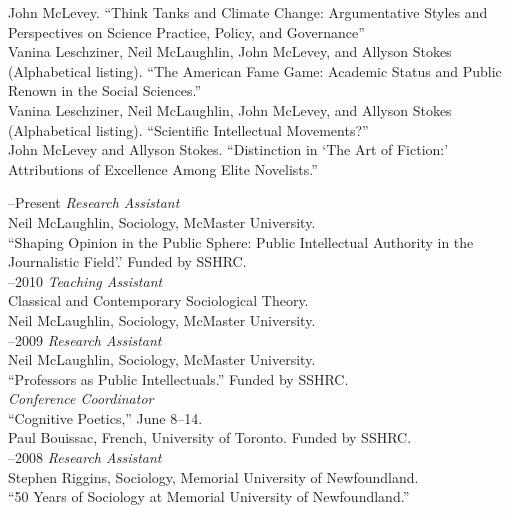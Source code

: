 \documentclass[11pt,usenames,dvipsnames]{article}
\begin{document}
\ind John McLevey. ``Think Tanks and Climate Change: Argumentative Styles and Perspectives on Science Practice, Policy, and Governance''\\

\ind Vanina Leschziner, Neil McLaughlin, John McLevey, and Allyson Stokes (Alphabetical listing). ``The American Fame Game: Academic Status and Public Renown in the Social Sciences.''\\

\ind Vanina Leschziner, Neil McLaughlin, John McLevey, and Allyson Stokes (Alphabetical listing). ``Scientific Intellectual Movements?''\\

\ind John McLevey and Allyson Stokes. ``Distinction in `The Art of Fiction:' Attributions of Excellence Among Elite Novelists.''\\



–Present {\it Research Assistant}\\
Neil McLaughlin, Sociology, McMaster University.\\ 
``Shaping Opinion in the Public Sphere: Public Intellectual Authority in the Journalistic Field'.' Funded by SSHRC.\\

–2010 {\it Teaching Assistant}\\
Classical and Contemporary Sociological Theory.\\
Neil McLaughlin, Sociology, McMaster University.\\

–2009 {\it Research Assistant}\\
Neil McLaughlin, Sociology, McMaster University.\\ 
``Professors as Public Intellectuals.'' Funded by SSHRC.\\

 {\it Conference Coordinator}\\
``Cognitive Poetics,'' June 8–14.\\ 
Paul Bouissac, French, University of Toronto. Funded by SSHRC.\\

–2008 {\it Research Assistant}\\
Stephen Riggins, Sociology, Memorial University of Newfoundland.\\ 
``50 Years of Sociology at Memorial University of Newfoundland.''\\
\end{document}
